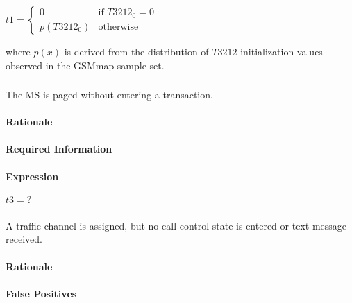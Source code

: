 \documentclass[a4paper,11pt,notitlepage,bigheadings,oneside]{scrartcl}
\begin{document}
$t1 =
\begin{cases}
	0 	 	& \text{if } T3212_0 = 0 \\
	p(T3212_0) 	& \text{otherwise}
\end{cases}$

where $p(x)$ is derived from the distribution of $T3212$ initialization values
observed in the GSMmap sample set.


\subsubsection{}

The MS is paged without entering a transaction.

\paragraph{Rationale}


\paragraph{Required Information}


\paragraph{Expression}

$t3 = ?$

\subsubsection{}

A traffic channel is assigned, but no call control state is entered or text
message received.

\paragraph{Rationale}


\paragraph{False Positives}
\end{document}
